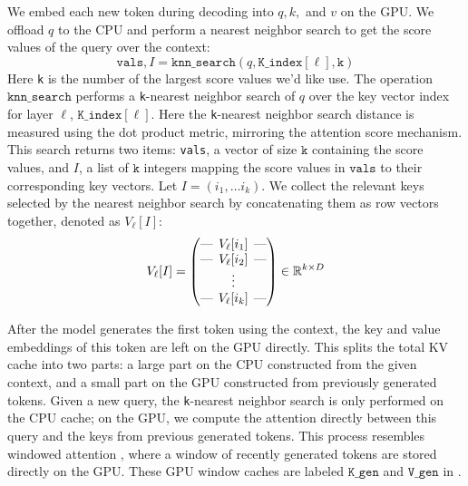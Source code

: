 We embed each new token during decoding into $q, k, $ and $v$ on the GPU. We offload $q$ to the CPU and perform a nearest neighbor search to get the \topk score values of the query over the context:
\[
    \texttt{vals}, I = \texttt{knn\_search}\left(q, \texttt{K\_index}[\ell], \texttt{k}\right)
\]
Here \texttt{k} is the number of the largest score values we'd like use. The operation $\texttt{knn\_search}$ performs a \texttt{k}-nearest neighbor search of $q$ over the key vector index for layer $\ell$, $\texttt{K\_index}[\ell]$. Here the \texttt{k}-nearest neighbor search distance is measured using the dot product metric, mirroring the attention score mechanism. This search returns two items: \texttt{vals}, a vector of size $\texttt{k}$ containing the \topk score values, and $I$, a list of $\texttt{k}$ integers mapping the score values in $\texttt{vals}$ to their corresponding key vectors. Let $I = (i_1, \dots i_k)$. We collect the relevant keys selected by the nearest neighbor search by concatenating them as row vectors together, denoted as $V_{\ell}[I]$:
\[
    V_{\ell}[I] =
    \begin{pmatrix}
        \text{---} \hspace{-0.2cm} & V_{\ell}[i_1] & \hspace{-0.2cm} \text{---}\\
        \text{---} \hspace{-0.2cm} & V_{\ell}[i_2] & \hspace{-0.2cm} \text{---}\\
                                   & \vdots        &                           \\
        \text{---} \hspace{-0.2cm} & V_{\ell}[i_k] & \hspace{-0.2cm} \text{---}\\
    \end{pmatrix}
    \in \mathbb{R}^{k\times D}
\]

After the model generates the first token using the context, the key and value embeddings of this token are left on the GPU directly. This splits the total KV cache into two parts: a large part on the CPU constructed from the given context, and a small part on the GPU constructed from previously generated tokens. Given a new query, the \texttt{k}-nearest neighbor search is only performed on the CPU cache; on the GPU, we compute the attention directly between this query and the keys from previous generated tokens. This process resembles windowed attention \citep{Beltagy2020Longformer}, where a window of recently generated tokens are stored directly on the GPU. These GPU window caches are labeled $\texttt{K\_gen}$ and $\texttt{V\_gen}$ in .


